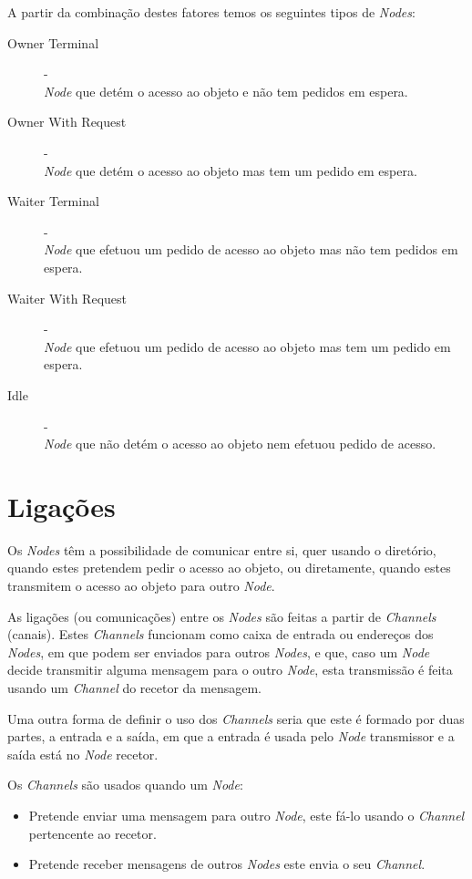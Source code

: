 A partir da combinação destes fatores temos os seguintes tipos de \emph{Nodes}:

\begin{description}
    \item [Owner Terminal] - \\ \emph{Node} que detém o acesso ao objeto e não tem pedidos em espera.
    \item [Owner With Request] - \\ \emph{Node} que detém o acesso ao objeto mas tem um pedido em espera.
    \item [Waiter Terminal] - \\ \emph{Node} que efetuou um pedido de acesso ao objeto mas não tem pedidos em espera.
    \item [Waiter With Request] - \\ \emph{Node} que efetuou um pedido de acesso ao objeto mas tem um pedido em espera.
    \item [Idle] - \\ \emph{Node} que não detém o acesso ao objeto nem efetuou pedido de acesso.
\end{description}



\section{Ligações}

Os \emph{Nodes} têm a possibilidade de comunicar entre si, quer usando o diretório, quando estes pretendem pedir o acesso ao objeto, ou diretamente, quando estes transmitem o acesso ao objeto para outro \emph{Node}.

As ligações (ou comunicações) entre os \emph{Nodes} são feitas a partir de \emph{Channels} (canais). Estes \emph{Channels} funcionam como caixa de entrada ou endereços dos \emph{Nodes}, em que podem ser enviados para outros \emph{Nodes}, e que, caso um \emph{Node} decide transmitir alguma mensagem para o outro \emph{Node}, esta transmissão é feita usando um \emph{Channel} do recetor da mensagem.

Uma outra forma de definir o uso dos \emph{Channels} seria que este é formado por duas partes, a entrada e a saída, em que a entrada é usada pelo \emph{Node} transmissor e a saída está no \emph{Node} recetor.

Os \emph{Channels} são usados quando um \emph{Node}:
\begin{itemize}
    \item Pretende enviar uma mensagem para outro \emph{Node}, este fá-lo usando o \emph{Channel} pertencente ao recetor.
    \item Pretende receber mensagens de outros \emph{Nodes} este envia o seu \emph{Channel}.
\end{itemize}


